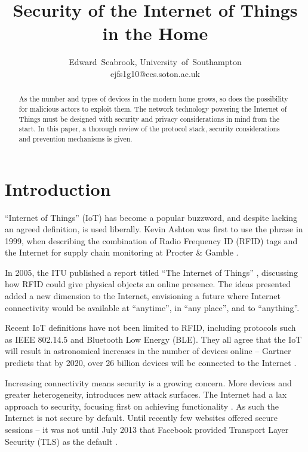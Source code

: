 \documentclass[10pt,journal,compsoc]{IEEEtran}
\begin{document}
\title{Security of the Internet of Things in the Home}
\author{Edward~Seabrook, University~of~Southampton \\ ejfs1g10@ecs.soton.ac.uk}

\maketitle

\begin{abstract}
As the number and types of devices in the modern home grows, so does the
possibility for malicious actors to exploit them. The network technology
powering the Internet of Things must be designed with security and privacy
considerations in mind from the start. In this paper, a thorough review of the
protocol stack, security considerations and prevention mechanisms is given. 
\end{abstract}

\IEEEpeerreviewmaketitle

\section{Introduction}
 ``Internet of Things'' (IoT) has become a popular
buzzword, and despite lacking an agreed definition, is used liberally. Kevin
Ashton was first to use the phrase in 1999, when describing the combination of
Radio Frequency ID (RFID) tags and the Internet for supply chain monitoring at
Procter \& Gamble \cite{Ashton2009}. 

In 2005, the ITU published a report titled ``The Internet of Things''
\cite{ITU_IoT}, discussing how RFID could give physical objects an online
presence. The ideas presented added a new dimension to the Internet,
envisioning a future where Internet connectivity would be available at
``anytime'', in ``any place'', and to ``anything''.

Recent IoT definitions have not been limited to RFID, including protocols such
as IEEE 802.14.5 and Bluetooth Low Energy (BLE). They all agree that the IoT
will result in astronomical increases in the number of devices online --
Gartner predicts that by 2020, over 26 billion devices will be connected to the
Internet \cite{Gartner2014}. 

Increasing connectivity means security is a growing concern. More devices and
greater heterogeneity, introduces new attack surfaces. The Internet had a lax
approach to security, focusing first on achieving functionality
\cite{Bhimani1996}. As such the Internet is not secure by default.
Until recently few websites offered secure sessions -- it was not until July
2013 that Facebook provided Transport Layer Security (TLS) as the default
\cite{Facebook2013}. 
\end{document}
